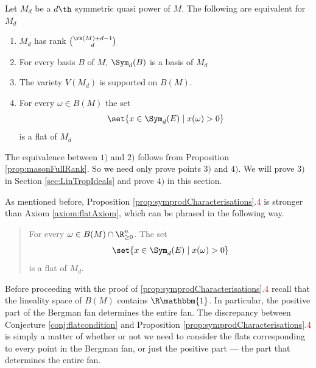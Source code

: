 \begin{proposition}\label{prop:symprodCharacterisations}
Let $M_d$ be a $d\th$ symmetric quasi power of $M$. The following are equivalent for $M_d$
\begin{enumerate}
    \item $M_d$ has rank $\binom{\rk(M)+d-1}{d}$
    \item For every basis $B$ of $M$, $\Sym_d(B)$ is a basis of $M_d$
    \item The variety $V(M_d)$ is supported on $B(M)$.
    \item For every $\omega\in B(M)$ the set
    $$\set{x\in \Sym_d(E)\mid x(\omega)>0}$$
    is a flat of $M_d$
\end{enumerate}
\end{proposition}
The equivalence between $1)$ and $2)$ follows from Proposition \ref{prop:masonFullRank}. So we need only prove points $3)$ and $4)$. We will prove $3)$ in Section \ref{sec:LinTropIdeals} and prove $4)$ in this section.

As mentioned before, Proposition \ref{prop:symprodCharacterisations}\textcolor{red}{.4} is stronger than Axiom \ref{axiom:flatAxiom}, which can be phrased in the following way.
\begin{quote}
    For every $\omega\in B(M)\cap \R^n_{\geq 0}$. The set
    $$\set{x\in \Sym_d(E)\mid x(\omega)>0}$$
    is a flat of $M_d$.
\end{quote}
Before proceeding with the proof of \ref{prop:symprodCharacterisations}\textcolor{red}{.4} recall that the lineality space of $B(M)$ contains $\R \mathbbm{1}$. In particular, the positive part of the Bergman fan determines the entire fan. The discrepancy between Conjecture \ref{conj:flatcondition} and Proposition \ref{prop:symprodCharacterisations}\textcolor{red}{.4} is simply a matter of whether or not we need to consider the flats corresponding to every point in the Bergman fan, or just the positive part --- the part that determines the entire fan.


